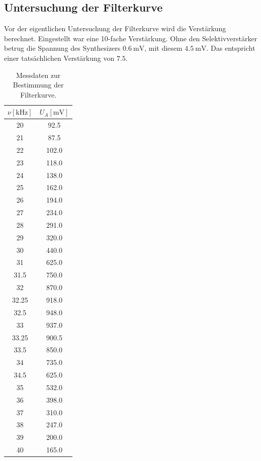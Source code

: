 \subsection{Untersuchung der Filterkurve}

Vor der eigentlichen Untersuchung der Filterkurve wird die Verstärkung berechnet.
Eingestellt war eine 10-fache Verstärkung.
Ohne den Selektivverstärker betrug die Spannung des Synthesizers $\SI{0.6}{\milli\volt}$,
mit diesem $\SI{4.5}{\milli\volt}$.
Das entspricht einer tatsächlichen Verstärkung von $\num{7.5}$.

\begin{table}
  \centering
  \caption{Messdaten zur Bestimmung der Filterkurve.}
  \label{tab:filterkurve}
  \begin{tabular}{S[table-format=2.2] S[table-format=3.1]}
  \toprule
  $\nu [\si{\kilo\hertz}]$ &
  $U_A [\si{\milli\volt}]$ \\
  \midrule
  20    & 92.5  \\
  21    & 87.5  \\
  22    & 102.0 \\
  23    & 118.0 \\
  24    & 138.0 \\
  25    & 162.0 \\
  26    & 194.0 \\
  27    & 234.0 \\
  28    & 291.0 \\
  29    & 320.0 \\
  30    & 440.0 \\
  31    & 625.0 \\
  31.5  & 750.0 \\
  32    & 870.0 \\
  32.25 & 918.0 \\
  32.5  & 948.0 \\
  33    & 937.0 \\
  33.25 & 900.5 \\
  33.5  & 850.0 \\
  34    & 735.0 \\
  34.5  & 625.0 \\
  35    & 532.0 \\
  36    & 398.0 \\
  37    & 310.0 \\
  38    & 247.0 \\
  39    & 200.0 \\
  40    & 165.0 \\
  \bottomrule
  \end{tabular}
\end{table}

